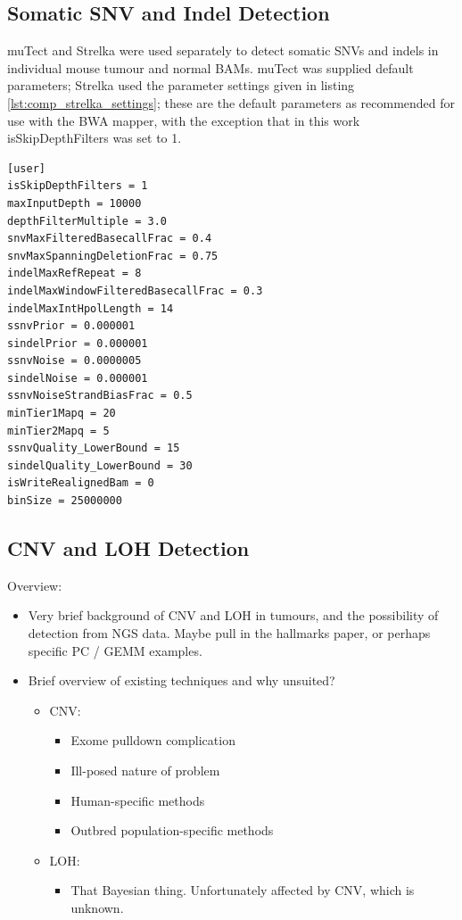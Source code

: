 \documentclass[dissertation.tex]{subfiles}
\begin{document}
\subsection{Somatic SNV and Indel Detection}

muTect and Strelka were used separately to detect somatic \glspl{SNV} and \glspl{indel} in individual mouse tumour and normal \glspl{BAM}.  muTect was supplied default parameters; Strelka used the parameter settings given in listing \ref{lst:comp_strelka_settings}; these are the default parameters as recommended for use with the BWA mapper, with the exception that in this work isSkipDepthFilters was set to 1.

\begin{lstlisting}[caption=Strelka configuration file used for SNV / indel detection,label=lst:comp_strelka_settings]
[user]
isSkipDepthFilters = 1
maxInputDepth = 10000
depthFilterMultiple = 3.0
snvMaxFilteredBasecallFrac = 0.4
snvMaxSpanningDeletionFrac = 0.75
indelMaxRefRepeat = 8
indelMaxWindowFilteredBasecallFrac = 0.3
indelMaxIntHpolLength = 14
ssnvPrior = 0.000001
sindelPrior = 0.000001
ssnvNoise = 0.0000005
sindelNoise = 0.000001
ssnvNoiseStrandBiasFrac = 0.5
minTier1Mapq = 20
minTier2Mapq = 5
ssnvQuality_LowerBound = 15
sindelQuality_LowerBound = 30
isWriteRealignedBam = 0
binSize = 25000000
\end{lstlisting}


\subsection{CNV and LOH Detection}

Overview:
\begin{itemize}
  \item Very brief background of CNV and LOH in tumours, and the possibility of detection from NGS data.  Maybe pull in the hallmarks paper, or perhaps specific PC / GEMM examples.
  \item Brief overview of existing techniques and why unsuited?
  \begin{itemize}
    \item CNV:
    \begin{itemize}
      \item Exome pulldown complication
      \item Ill-posed nature of problem
      \item Human-specific methods
      \item Outbred population-specific methods
    \end{itemize}
    \item LOH:
    \begin{itemize}
      \item That Bayesian thing.  Unfortunately affected by CNV, which is unknown.
    \end{itemize}
  \end{itemize}
\end{itemize}
\end{document}
